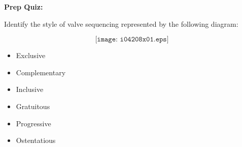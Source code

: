\vfil \eject

\noindent
{\bf Prep Quiz:}

Identify the style of valve sequencing represented by the following diagram:

$$\texttt{[image: i04208x01.eps]}$$

\begin{itemize}
\item{} Exclusive
\vskip 5pt 
\item{} Complementary
\vskip 5pt 
\item{} Inclusive
\vskip 5pt 
\item{} Gratuitous
\vskip 5pt 
\item{} Progressive
\vskip 5pt 
\item{} Ostentatious
\end{itemize}





